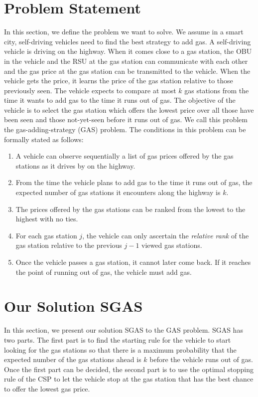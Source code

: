 \documentclass[conference]{IEEEtran}
\theoremstyle{definition}
\begin{document}
\section{Problem Statement} \label{problem}
In this section, we define the problem we want to solve. We assume in a smart city, self-driving vehicles need to find the best strategy to add gas. A self-driving vehicle is driving on the highway. When it comes close to a gas station, the OBU in the vehicle and the RSU at the gas station can communicate with each other and the gas price at the gas station can be transmitted to the vehicle. When the vehicle gets the price, it learns the price of the gas station relative to those previously seen. The vehicle expects to compare at most $k$ gas stations from the time it wants to add gas to the time it runs out of gas. The objective of the vehicle is to select the gas station which offers the lowest price over all those have been seen and those not-yet-seen before it runs out of gas. We call this problem the gas-adding-strategy (GAS) problem. The conditions in this problem can be formally stated as follows:

\begin{enumerate}
\item A vehicle can observe sequentially a list of gas prices offered by the gas stations as it drives by on the highway.
\item From the time the vehicle plans to add gas to the time it runs out of gas, the expected number of gas stations it encounters along the highway is $k$.
\item The prices offered by the gas stations can be ranked from the lowest to the highest with no ties.
\item For each gas station $j$, the vehicle can only ascertain the {\em relative rank} of the gas station relative to the previous $j-1$ viewed gas stations.
\item Once the vehicle passes a gas station, it cannot later come back. If it reaches the point of running out of gas, the vehicle must add gas.
\end{enumerate}


\section{Our Solution SGAS}
In this section, we present our solution SGAS to the GAS problem. SGAS has two parts. The first part is to find the starting rule for the vehicle to start looking for the gas stations so that there is a maximum probability that the expected number of the gas stations ahead is $k$ before the vehicle runs out of gas. Once the first part can be decided, the second part is to use the optimal stopping rule of the CSP to let the vehicle stop at the gas station that has the best chance to offer the lowest gas price.
\end{document}
